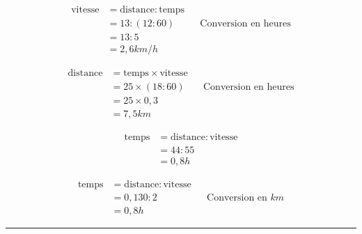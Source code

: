 \begin{multicols}{2}
    \exo{}{} %
    \begin{align*}
        \text{vitesse}&=\text{distance}:\text{temps}&&\\
        &=13:(12:60)&&\text{Conversion en heures}\\
        &=13:5&&\\
        &=2,6km/h
    \end{align*}

    \exo{}{} %
    \begin{align*}
        \text{distance}&=\text{temps}\times\text{vitesse}&&\\
        &=25\times(18:60)&&\text{Conversion en heures}\\
        &=25\times 0,3&&\\
        &=7,5km
    \end{align*}

\end{multicols}


\begin{multicols}{2}
    \exo{}{} %
    \begin{align*}
        \text{temps}&=\text{distance}:\text{vitesse}\\
        &=44:55\\
        &=0,8h
    \end{align*}

    \exo{}{} %
    \begin{align*}
        \text{temps}&=\text{distance}:\text{vitesse}&&\\
        &=0,130:2&&\text{Conversion en }km\\
        &=0,8h&&
    \end{align*}

\end{multicols}

\hrule \vspace{-0.5em}%
